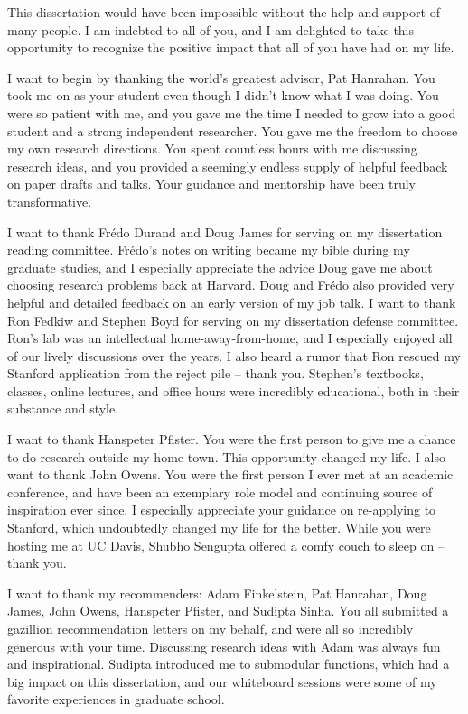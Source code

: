 
This dissertation would have been impossible without the help and support of many people.
I am indebted to all of you, and I am delighted to take this opportunity to recognize the positive impact that all of you have had on my life.

I want to begin by thanking the world's greatest advisor, Pat Hanrahan.
You took me on as your student even though I didn't know what I was doing.
You were so patient with me, and you gave me the time I needed to grow into a good student and a strong independent researcher.
You gave me the freedom to choose my own research directions.
You spent countless hours with me discussing research ideas, and you provided a seemingly endless supply of helpful feedback on paper drafts and talks.
Your guidance and mentorship have been truly transformative.

I want to thank Fr{\'e}do Durand and Doug James for serving on my dissertation reading committee.
Fr{\'e}do's notes on writing became my bible during my graduate studies, and I especially appreciate the advice Doug gave me about choosing research problems back at Harvard.
Doug and Fr{\'e}do also provided very helpful and detailed feedback on an early version of my job talk. I want to thank Ron Fedkiw and Stephen Boyd for serving on my dissertation defense committee.
Ron's lab was an intellectual home-away-from-home, and I especially enjoyed all of our lively discussions over the years.
I also heard a rumor that Ron rescued my Stanford application from the reject pile -- thank you.
Stephen's textbooks, classes, online lectures, and office hours were incredibly educational, both in their substance and style.

I want to thank Hanspeter Pfister.
You were the first person to give me a chance to do research outside my home town.
This opportunity changed my life.
I also want to thank John Owens.
You were the first person I ever met at an academic conference, and have been an exemplary role model and continuing source of inspiration ever since.
I especially appreciate your guidance on re-applying to Stanford, which undoubtedly changed my life for the better.
While you were hosting me at UC Davis, Shubho Sengupta offered a comfy couch to sleep on -- thank you.

I want to thank my recommenders:
Adam Finkelstein, Pat Hanrahan, Doug James, John Owens, Hanspeter Pfister, and Sudipta Sinha.
You all submitted a gazillion recommendation letters on my behalf, and were all so incredibly generous with your time.
Discussing research ideas with Adam was always fun and inspirational.
Sudipta introduced me to submodular functions, which had a big impact on this dissertation, and our whiteboard sessions were some of my favorite experiences in graduate school.

